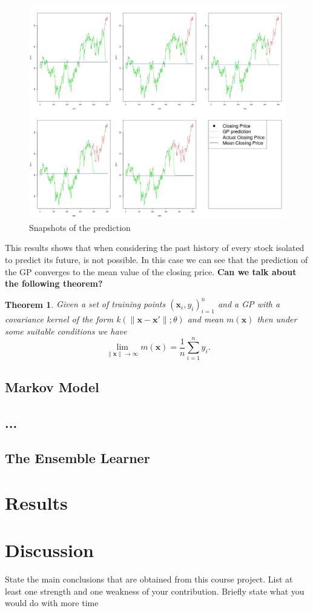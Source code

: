 \documentclass{article}
\newtheorem{theorem}{Theorem}
\newcommand{\x}{\textbf{x}}
\def\blu#1{{\color{blu}#1}}
\begin{document}
\begin{figure}[H]
\centering
\includegraphics[scale=0.35]{../Algorithms/Juan/figures/snapshots}
\caption{Snapshots of the prediction}
\end{figure}

This results shows that when considering the past history of every stock isolated to predict its future, is
not possible. In this case we can see that the prediction of the GP converges to the mean value
of the closing price. \textbf{Can we talk about the following theorem?}

\begin{theorem}
Given a set of training points $(\x_{i},y_{i})_{i=1}^{n}$ and  a GP with a covariance kernel of the form 
$k(\|\x-\x'\|;\theta)$ and mean $m(\x)$ then 
under some suitable conditions we have 
\begin{equation*}
\lim_{\|\x\|\rightarrow\infty}m(\x)=\frac{1}{n}\sum_{i=1}^{n}y_{i}.
\end{equation*}
\end{theorem}




\subsection{Markov Model}
\subsection{...}
\subsection{The Ensemble Learner}

\section{Results}

\section{Discussion}
\blu{State the main conclusions that are obtained from this course project.
List at least one strength and one weakness of your contribution. Briefly state what you would do with
more time}

 
\end{document}
